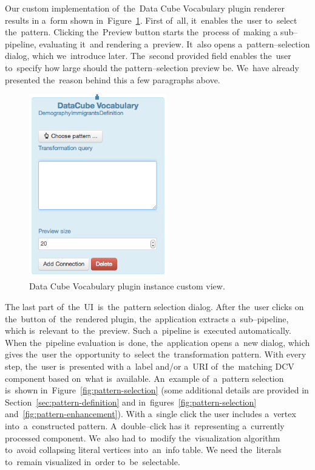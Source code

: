 Our custom implementation of~the~Data Cube Vocabulary plugin renderer results 
in a~form shown in~Figure~\ref{fig:DCV-plugin-view}. First of~all, it~enables the~user to~select the~pattern. Clicking the~Preview button starts the~process of~making a
sub--pipeline, evaluating it~and rendering a~preview. It~also opens a~pattern--selection
dialog, which we~introduce later. The~second provided field enables the~user to~specify how large should 
the pattern--selection preview be. We~have already presented the~reason behind this 
a few paragraphs above.

\begin{figure}
	\centering
	\includegraphics[width=60mm]{img/custom-dcv-piv.png}
	\caption{Data Cube Vocabulary plugin instance custom view.}
	\label{fig:DCV-plugin-view}
\end{figure}

The last part of~the~UI~is~the~pattern selection dialog. After the~user clicks 
on the~button of~the~rendered plugin, the~application extracts a~sub--pipeline, 
which is~relevant to~the~preview. Such a~pipeline is~executed
automatically. When the~pipeline evaluation is~done, the~application opens a~new 
dialog, which gives the~user the~opportunity to~select the~transformation 
pattern. With every step, the~user is~presented with a~label and/or a~URI of~the~matching DCV component based on~what is~available. An~example of~a~pattern 
selection is~shown in~Figure~\ref{fig:pattern-selection} (some additional details are provided
in Section~\ref{sec:pattern-definition}
and in~figures~\ref{fig:pattern-selection} and~\ref{fig:pattern-enhancement}).
With a~single click 
the user includes a~vertex into~a~constructed pattern. A~double--click 
has it~representing a~currently processed component. We~also had to~modify the~visualization algorithm to~avoid collapsing literal vertices into~an~info table. 
We need the~literals to~remain visualized in~order to~be~selectable.

